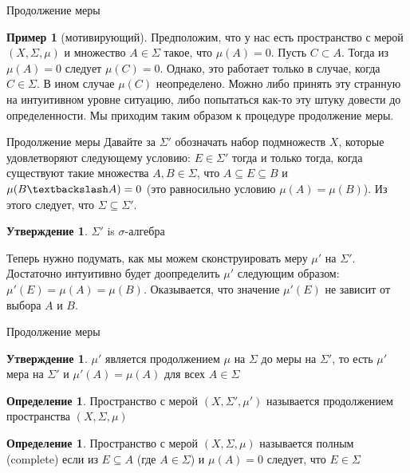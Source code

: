 \documentclass{beamer}%
\theoremstyle{definition}
\newtheorem{mydef}[theorem]{Определение}
\newtheorem{proposition}[theorem]{Утверждение}
\newtheorem{myexample}[theorem]{Пример}
\begin{document}
\begin{frame}{Продолжение меры}
    \begin{myexample}[мотивирующий]
        Предположим, что у нас есть пространство с мерой $(X, \Sigma, \mu)$ и множество $A \in \Sigma$ такое, что $\mu(A) = 0$. Пусть $C \subset A$. Тогда из $\mu(A) = 0$ следует $\mu(C) = 0$. Однако, это работает только в случае, когда $C \in \Sigma$. В ином случае $\mu(C)$ неопределено. Можно либо принять эту странную на интуитивном уровне ситуацию, либо попытаться как-то эту штуку довести до определенности. Мы приходим таким образом к процедуре продолжение меры.
    \end{myexample}
\end{frame}

\begin{frame}{Продолжение меры}
    Давайте за $\Sigma'$ обозначать набор подмножеств $X$, которые удовлетворяют следующему условию: $E \in \Sigma'$ тогда и только тогда, когда существуют такие множества $A, B \in \Sigma$, что $A \subseteq E \subseteq B$ и $\mu(B \textbackslash A) = 0$ (это равносильно условию $\mu(A) = \mu(B)$). Из этого следует, что $\Sigma \subseteq \Sigma'$.
    \begin{proposition}
        $\Sigma'$ is $\sigma$-алгебра
    \end{proposition}
    Теперь нужно подумать, как мы можем сконструировать меру $\mu'$ на $\Sigma'$. Достаточно интуитивно будет доопределить $\mu'$ следующим образом: $\mu'(E) = \mu(A) = \mu(B) $. Оказывается, что значение $\mu'(E)$ не зависит от выбора $A$ и $B$.
\end{frame}

\begin{frame}{Продолжение меры}
    \begin{proposition}
        $\mu'$ является продолжением $\mu$ на $\Sigma$ до меры на $\Sigma'$, то есть $\mu'$ мера на $\Sigma'$ и $\mu'(A) = \mu(A)$ для всех $A \in \Sigma$
    \end{proposition}
    \begin{mydef}
        Пространство с мерой $(X, \Sigma', \mu')$ называется продолжением пространства $(X, \Sigma, \mu)$
    \end{mydef}
    \begin{mydef}
        Пространство с мерой $(X, \Sigma, \mu)$ называется полным (complete) если из $E \subseteq A$ (где $A \in \Sigma$) и $\mu(A) = 0$ следует, что $E \in \Sigma$
    \end{mydef}
    
\end{frame}
\end{document}
